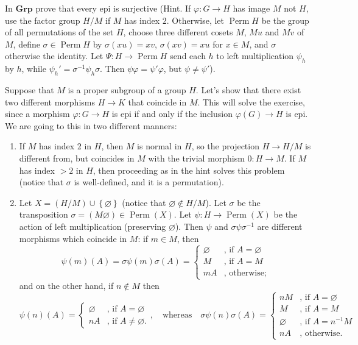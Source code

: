 \begin{exercise}
In $\mathbf{Grp}$ prove that every epi is surjective (Hint. If $\varphi:G\to H$ has image $M$ not $H$, use the factor group $H/M$ if $M$ has index $2$. Otherwise, let $\operatorname{Perm}H$ be the group of all permutations of the set $H$, choose three different cosets $M$, $Mu$ and $Mv$ of $M$, define $\sigma\in\operatorname{Perm}H$ by $\sigma(xu)=xv$, $\sigma(xv)=xu$ for $x\in M$, and $\sigma$ otherwise the identity. Let $\Psi:H\to\operatorname{Perm}H$ send each $h$ to left multiplication $\psi_h$ by $h$, while $\psi_h'=\sigma^{-1}\psi_h\sigma$. Then $\psi\varphi=\psi'\varphi$, but $\psi\neq\psi'$).
\end{exercise}
\begin{solution}
Suppose that $M$ is a proper subgroup of a group $H$. Let's show that there exist two different morphisms $H\to K$ that coincide in $M$. This will solve the exercise, since a morphism $\varphi:G\to H$ is epi if and only if the inclusion $\varphi(G)\to H$ is epi. We are going to this in two different manners:
\begin{enumerate}
\item If $M$ has index 2 in $H$, then $M$ is normal in $H$, so the projection $H\to H/M$ is different from, but coincides in $M$ with the trivial morphism $0:H\to M$. If $M$ has index $>2$ in $H$, then proceeding as in the hint solves this problem (notice that $\sigma$ is well-defined, and it is a permutation).

\item Let $X=(H/M)\cup\left\{\varnothing\right\}$ (notice that $\varnothing\not\in H/M$). Let $\sigma$ be the transposition $\sigma=(M\varnothing)\in\operatorname{Perm}(X)$. Let $\psi:H\to\operatorname{Perm}(X)$ be the action of left multiplication (preserving $\varnothing$). Then $\psi$ and $\sigma\psi\sigma^{-1}$ are different morphisms which coincide in $M$: if $m\in M$, then
\[\psi(m)(A)=\sigma\psi(m)\sigma(A)=\begin{cases}
\varnothing&\text{, if }A=\varnothing\\
M&\text{, if }A=M\\
mA&\text{, otherwise;}
\end{cases}\]
and on the other hand, if $n\not\in M$ then
\[\psi(n)(A)=\begin{cases}
\varnothing&\text{, if }A=\varnothing\\
nA&\text{, if }A\neq\varnothing.
\end{cases},\quad\text{whereas}\quad\sigma\psi(n)\sigma(A)=\begin{cases}
nM&\text{, if }A=\varnothing\\
M&\text{, if }A=M\\
\varnothing&\text{, if }A=n^{-1}M\\
nA&\text{, otherwise}.
\end{cases}\]
\end{enumerate}
\end{solution}

